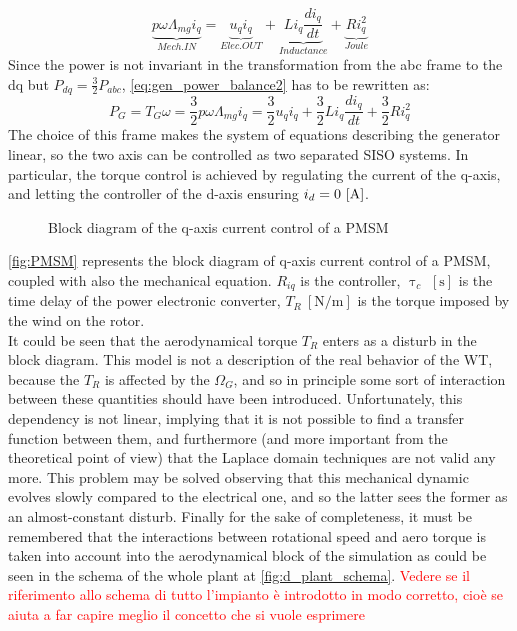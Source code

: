 \begin{equation}
  \underbrace{p\omega\Lambda_{mg}i_q}_{Mech. IN} = \underbrace{u_qi_q}_{Elec. OUT}+ \underbrace{L i_q\frac{di_q}{dt}}_{Inductance} + \underbrace{Ri_q^2}_{Joule}
  \label{eq:gen_power_balance2}
\end{equation}
Since the power is not invariant in the transformation from the abc frame to the dq but $P_{dq} = \frac{3}{2}P_{abc}$, \autoref{eq:gen_power_balance2} has to be rewritten as:
\begin{equation}
  P_G = T_G\omega = \frac{3}{2}p\omega\Lambda_{mg}i_q = \frac{3}{2}u_qi_q + \frac{3}{2}L i_q\frac{di_q}{dt} + \frac{3}{2}R i_q^2
  \label{eq:gen_power_balance3}
\end{equation}
The choice of this frame makes the system of equations describing the generator linear, so the two axis can be controlled as two separated \acrfull{SISO} systems. In particular, the torque control is achieved by regulating the current of the q-axis, and letting the controller of the d-axis ensuring $i_d=0 \, \left[\si{\ampere}\right]$.
\begin{figure}[htb]

\caption{Block diagram of the q-axis current control of a PMSM}
\label{fig:PMSM}
\end{figure}

\autoref{fig:PMSM} represents the block diagram of q-axis current control of a \acrshort{PMSM}, coupled with also the mechanical equation. $R_{iq}$ is the controller, $\uptau_{c}$ $\left[\si{\second}\right]$ is the time delay of the power electronic converter, $T_R \ \left[\si{\newton \per \meter}\right]$ is the torque imposed by the wind on the rotor.\\
It could be seen that the aerodynamical torque $T_R$ enters as a disturb in the block diagram. This model is not a description of the real behavior of the \acrshort{WT}, because the $T_R$ is affected by the $\Omega_G$, and so in principle some sort of interaction between these quantities should have been introduced. Unfortunately, this dependency is not linear, implying that it is not possible to find a transfer function between them, and furthermore (and more important from the theoretical point of view) that the Laplace domain techniques are not valid any more. This problem may be solved observing that this mechanical dynamic evolves slowly compared to the electrical one, and so the latter sees the former as an almost-constant disturb. Finally for the sake of completeness, it must be remembered that the interactions between rotational speed and aero torque is taken into account into the aerodynamical block of the simulation as could be seen in the schema of the whole plant at \autoref{fig:d_plant_schema}. \textcolor{red}{Vedere se il riferimento allo schema di tutto l'impianto è introdotto in modo corretto, cioè se aiuta a far capire meglio il concetto che si vuole esprimere}\\

